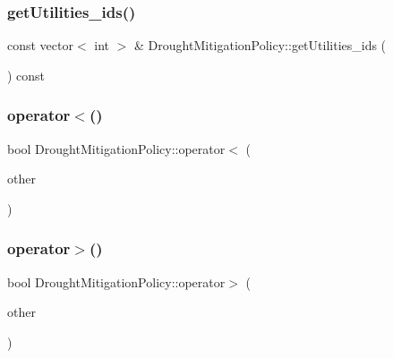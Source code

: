 \mbox{\label{classDroughtMitigationPolicy_aad53e4f995e3fe18b580f39d15daeefc_aad53e4f995e3fe18b580f39d15daeefc}} 
\subsubsection{\texorpdfstring{get\+Utilities\+\_\+ids()}{getUtilities\_ids()}}
{\footnotesize\ttfamily const vector$<$ int $>$ \& Drought\+Mitigation\+Policy\+::get\+Utilities\+\_\+ids (\begin{DoxyParamCaption}{ }\end{DoxyParamCaption}) const}

\mbox{\label{classDroughtMitigationPolicy_a0bf7d0fa94377ae6814e529daf0204c4_a0bf7d0fa94377ae6814e529daf0204c4}} 
\subsubsection{\texorpdfstring{operator$<$()}{operator<()}}
{\footnotesize\ttfamily bool Drought\+Mitigation\+Policy\+::operator$<$ (\begin{DoxyParamCaption}\item[{const \mbox{\hyperlink{classDroughtMitigationPolicy}{Drought\+Mitigation\+Policy}} $\ast$}]{other }\end{DoxyParamCaption})}

\mbox{\label{classDroughtMitigationPolicy_a576d3ddb09dc9372898a63c0949d08a6_a576d3ddb09dc9372898a63c0949d08a6}} 
\subsubsection{\texorpdfstring{operator$>$()}{operator>()}}
{\footnotesize\ttfamily bool Drought\+Mitigation\+Policy\+::operator$>$ (\begin{DoxyParamCaption}\item[{const \mbox{\hyperlink{classDroughtMitigationPolicy}{Drought\+Mitigation\+Policy}} $\ast$}]{other }\end{DoxyParamCaption})}

